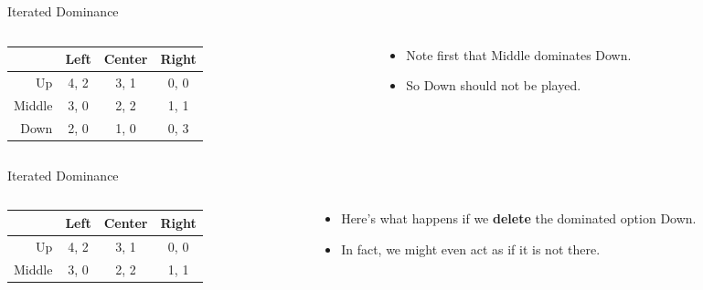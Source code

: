 \documentclass[
  14pt,
  letterpaper,
  ignorenonframetext,
  aspectratio=169,
  handout]{beamer}
\providecommand{\tightlist}{%
  \setlength{\itemsep}{0pt}\setlength{\parskip}{0pt}}\usepackage{longtable,booktabs,array}
\let\olditem\item
\renewcommand{\item}{%
\olditem\vspace{6pt}}
\begin{document}
\begin{frame}{Iterated Dominance}
\protect\hypertarget{iterated-dominance-1}{}
\begin{columns}[T]
\begin{column}{0.5\textwidth}
\begin{table}[!h]
\centering
\begin{tabular}[t]{>{}r|ccc}
\toprule
 & Left & Center & Right\\
\midrule
Up & 4, 2 & 3, 1 & 0, 0\\
Middle & 3, 0 & 2, 2 & 1, 1\\
Down & 2, 0 & 1, 0 & 0, 3\\
\bottomrule
\end{tabular}
\end{table}
\end{column}

\begin{column}{0.5\textwidth}
\begin{itemize}[<+->]
\tightlist
\item
  Note first that Middle dominates Down.
\item
  So Down should not be played.
\end{itemize}
\end{column}
\end{columns}
\end{frame}

\begin{frame}{Iterated Dominance}
\protect\hypertarget{iterated-dominance-2}{}
\begin{columns}[T]
\begin{column}{0.5\textwidth}
\begin{table}[!h]
\centering
\begin{tabular}[t]{>{}r|ccc}
\toprule
 & Left & Center & Right\\
\midrule
Up & 4, 2 & 3, 1 & 0, 0\\
Middle & 3, 0 & 2, 2 & 1, 1\\
\bottomrule
\end{tabular}
\end{table}
\end{column}

\begin{column}{0.5\textwidth}
\begin{itemize}[<+->]
\tightlist
\item
  Here's what happens if we \textbf{delete} the dominated option Down.
\item
  In fact, we might even act as if it is not there.
\end{itemize}
\end{column}
\end{columns}
\end{frame}
\end{document}
